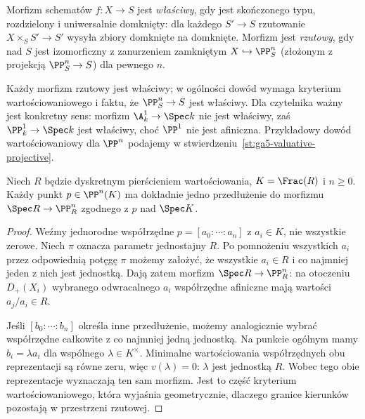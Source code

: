 \begin{definicja}
\label{def:ga5-proper}
Morfizm schematów $f:X\to S$ jest \emph{właściwy}, gdy jest
skończonego typu, rozdzielony i uniwersalnie domknięty:
dla każdego $S'\to S$ rzutowanie
$X\times_S S'\to S'$ wysyła zbiory domknięte na domknięte.
Morfizm jest \emph{rzutowy}, gdy nad $S$ jest izomorficzny
z zanurzeniem zamkniętym $X\hookrightarrow\PP^n_S$
(złożonym z projekcją $\PP^n_S\to S$) dla pewnego $n$.
\end{definicja}

\begin{uwaga}
Każdy morfizm rzutowy jest właściwy; w ogólności dowód wymaga
kryterium wartościowaniowego i faktu, że $\PP^n_S\to S$ jest
właściwy. Dla czytelnika ważny jest konkretny sens:
morfizm $\A^1_k\to\Spec k$ nie jest właściwy, zaś
$\PP^1_k\to\Spec k$ jest właściwy, choć $\PP^1$ nie jest
afiniczna. Przykładowy dowód wartościowaniowy dla
$\PP^n$ podajemy w stwierdzeniu~\ref{st:ga5-valuative-projective}.
\end{uwaga}

\begin{stwierdzenie}
\label{st:ga5-valuative-projective}
Niech $R$ będzie dyskretnym pierścieniem wartościowania,
$K=\Frac(R)$ i $n\ge0$. Każdy punkt $p\in\PP^n(K)$
ma dokładnie jedno przedłużenie do morfizmu
$\Spec R\to\PP^n_R$ zgodnego z $p$ nad $\Spec K$.
\end{stwierdzenie}
\begin{proof}
Weźmy jednorodne współrzędne $p=[a_0:\cdots:a_n]$
z $a_i\in K$, nie wszystkie zerowe. Niech $\pi$ oznacza
parametr jednostajny $R$. Po pomnożeniu wszystkich
$a_i$ przez odpowiednią potęgę $\pi$ możemy założyć,
że wszystkie $a_i\in R$ i co najmniej jeden z nich jest
jednostką. Dają zatem morfizm $\Spec R\to\PP^n_R$:
na otoczeniu $D_+(X_i)$ wybranego odwracalnego $a_i$
współrzędne afiniczne mają wartości $a_j/a_i\in R$.

Jeśli $[b_0:\cdots:b_n]$ określa inne przedłużenie,
możemy analogicznie wybrać współrzędne całkowite z
co najmniej jedną jednostką. Na punkcie ogólnym mamy
$b_i=\lambda a_i$ dla wspólnego $\lambda\in K^\times$.
Minimalne wartościowania współrzędnych obu reprezentacji
są równe zeru, więc $v(\lambda)=0$: $\lambda$ jest
jednostką $R$. Wobec tego obie reprezentacje wyznaczają
ten sam morfizm. Jest to część kryterium wartościowaniowego,
która wyjaśnia geometrycznie, dlaczego granice kierunków
pozostają w przestrzeni rzutowej.
\end{proof}

